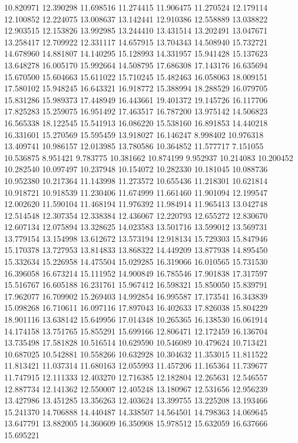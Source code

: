 10.820971
12.390298
11.698516
11.274415
11.906475
11.270524
12.179114
12.100852
12.224075
13.008637
13.142441
12.910386
12.558889
13.038822
12.903515
12.153826
13.992985
13.244410
13.431514
13.202491
13.047671
13.258417
12.709922
12.331117
14.657915
13.704343
14.508940
15.732721
14.678960
14.881807
14.140295
15.128993
14.331957
15.941428
15.137623
13.648278
16.005170
15.992664
14.508795
17.686308
17.143176
16.635694
15.670500
15.604663
15.611022
15.710245
15.482463
16.058063
18.009151
17.580102
15.948245
16.643321
16.918772
15.388994
18.288529
16.079705
15.831286
15.989373
17.448949
16.443661
19.401372
19.145726
16.117706
17.825283
15.259075
16.951492
17.463517
16.787200
13.975142
14.506823
16.565338
18.122545
15.541913
16.086220
15.538160
16.891853
14.440218
16.331601
15.270569
15.595459
13.918027
16.146247
8.998402
10.976318
13.409741
10.986157
12.013985
13.780586
10.364852
11.577717
7.151055
10.536875
8.951421
9.783775
10.381662
10.874199
9.952937
10.214083
10.200452
10.282540
10.097497
10.237948
10.154072
10.282330
10.181045
10.088736
10.952380
10.217364
11.143998
11.273572
10.655436
11.218301
10.621814
10.918721
10.918539
11.230406
11.674999
11.661460
11.901094
12.199547
12.002620
11.590104
11.468194
11.976392
11.984914
11.965413
13.042748
12.514548
12.307354
12.338384
12.436067
12.220793
12.655272
12.830670
12.607134
12.075894
13.328625
14.023583
13.501716
13.599012
13.569731
13.779154
13.154998
13.612672
13.573194
12.918134
15.729303
15.847946
15.170378
13.727953
13.814833
13.868322
14.449209
13.877938
14.895450
15.332634
15.226958
14.475504
15.029285
16.319066
16.010565
15.731530
16.396058
16.673214
15.111952
14.900849
16.785546
17.901838
17.317597
15.516767
16.605188
16.231761
15.967412
16.598321
15.850050
15.839791
17.962077
16.709902
15.269403
14.992854
16.995587
17.173541
16.343839
15.098268
16.710611
16.097116
17.897043
16.402633
17.826038
15.804229
18.901116
13.638142
15.649956
17.014348
10.265365
16.138530
16.061914
14.174158
13.751765
15.855291
15.699166
12.806471
12.172459
16.136704
13.735498
17.581828
10.516514
10.629590
10.546089
10.479624
10.713421
10.687025
10.542881
10.558266
10.632928
10.304632
11.353015
11.811522
11.813421
11.037314
11.680163
12.055993
11.457206
11.165364
11.739677
11.747915
12.111333
12.403270
12.716385
12.182804
12.265631
12.546557
12.887734
12.141362
12.550007
12.405248
13.180967
12.531656
12.956239
13.427986
13.451285
13.356263
12.403624
13.399755
13.225208
13.193466
15.241370
14.706888
14.440487
14.338507
14.564501
14.798363
14.069645
13.647791
13.882005
14.360609
16.350908
15.978512
15.632059
16.637666
15.695221

